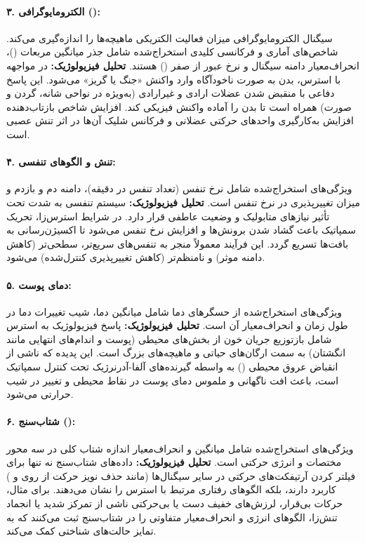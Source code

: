\documentclass[12pt,a4paper]{article}
\begin{document}
\paragraph{۳. الکترومایوگرافی ():}
سیگنال الکترومایوگرافی میزان فعالیت الکتریکی ماهیچه‌ها را اندازه‌گیری می‌کند. شاخص‌های آماری و فرکانسی کلیدی استخراج‌شده شامل جذر میانگین مربعات ()، انحراف‌معیار دامنه سیگنال و نرخ عبور از صفر () هستند.  
\textbf{تحلیل فیزیولوژیک:} در مواجهه با استرس، بدن به صورت ناخودآگاه وارد واکنش «جنگ یا گریز» می‌شود. این پاسخ دفاعی با منقبض شدن عضلات ارادی و غیرارادی (به‌ویژه در نواحی شانه، گردن و صورت) همراه است تا بدن را آماده واکنش فیزیکی کند. افزایش شاخص  بازتاب‌دهنده افزایش به‌کارگیری واحدهای حرکتی عضلانی و فرکانس شلیک آن‌ها در اثر تنش عصبی است.

\paragraph{۴. تنش و الگوهای تنفسی:}
ویژگی‌های استخراج‌شده شامل نرخ تنفس (تعداد تنفس در دقیقه)، دامنه دم و بازدم و میزان تغییرپذیری در نرخ تنفس است.  
\textbf{تحلیل فیزیولوژیک:} سیستم تنفسی به شدت تحت تأثیر نیازهای متابولیک و وضعیت عاطفی قرار دارد. در شرایط استرس‌زا، تحریک سمپاتیک باعث گشاد شدن برونش‌ها و افزایش نرخ تنفس می‌شود تا اکسیژن‌رسانی به بافت‌ها تسریع گردد. این فرآیند معمولاً منجر به تنفس‌های سریع‌تر، سطحی‌تر (کاهش دامنه موثر) و نامنظم‌تر (کاهش تغییرپذیری کنترل‌شده) می‌شود.

\paragraph{۵. دمای پوست:}
ویژگی‌های استخراج‌شده از حسگرهای دما شامل میانگین دما، شیب تغییرات دما در طول زمان و انحراف‌معیار آن است.  
\textbf{تحلیل فیزیولوژیک:} پاسخ فیزیولوژیک به استرس شامل بازتوزیع جریان خون از بخش‌های محیطی (پوست و اندام‌های انتهایی مانند انگشتان) به سمت ارگان‌های حیاتی و ماهیچه‌های بزرگ است. این پدیده که ناشی از انقباض عروق محیطی () به واسطه گیرنده‌های آلفا-آدرنرژیک تحت کنترل سمپاتیک است، باعث افت ناگهانی و ملموس دمای پوست در نقاط محیطی و تغییر در شیب حرارتی می‌شود.

\paragraph{۶. شتاب‌سنج ():}
ویژگی‌های استخراج‌شده شامل میانگین و انحراف‌معیار اندازه شتاب کلی در سه محور مختصات و انرژی حرکتی است.  
\textbf{تحلیل فیزیولوژیک:} داده‌های شتاب‌سنج نه تنها برای فیلتر کردن آرتیفکت‌های حرکتی در سایر سیگنال‌ها (مانند حذف نویز حرکت از روی  و ) کاربرد دارند، بلکه الگوهای رفتاری مرتبط با استرس را نشان می‌دهند. برای مثال، حرکات بی‌قرار، لرزش‌های خفیف دست یا بی‌حرکتی ناشی از تمرکز شدید یا انجماد تنش‌زا، الگوهای انرژی و انحراف‌معیار متفاوتی را در شتاب‌سنج ثبت می‌کنند که به تمایز حالت‌های شناختی کمک می‌کند.
\end{document}
